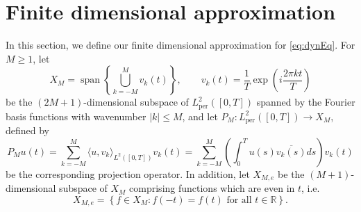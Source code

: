 \documentclass[12pt,reqno]{amsart}
\def\R{{\mathbb R}}
\def\C{{\mathbb C}}
\def\Z{{\mathbb Z}}
\def\per{\textrm{per}}
\DeclareMathOperator{\spn}{span}
\newtheorem{lemma}{Lemma}
\theoremstyle{definition}
\begin{document}

\section{Finite dimensional approximation}\label{sec:findim}

In this section, we define our finite dimensional approximation for \cref{eq:dynEq}. For $M \geq 1$, let 
\begin{equation}\label{eq:XM}
X_M = \spn\left\{ \bigcup_{k = -M}^M v_k(t) \right\}, \qquad
v_k(t) = \frac{1}{T} \exp\left( i \frac{2 \pi k t}{T} \right)
\end{equation}
be the $(2M+1)$-dimensional subspace of $L_\per^2([0,T])$ spanned by the Fourier basis functions with wavenumber $|k| \leq M$, and let $P_M: L_\per^2([0,T]) \rightarrow X_M$, defined by
\begin{equation}\label{eq:PM}
P_M u(t) = \sum_{k=-M}^M \langle u, v_k \rangle_{L^2([0,T])} v_k(t)
= \sum_{k=-M}^M \left( \int_0^T u(s) \overline{v_k(s)} ds \right) v_k(t)
\end{equation}
be the corresponding projection operator. In addition, let $X_{M,e}$ be the $(M+1)$-dimensional subspace of $X_M$ comprising functions which are even in $t$, i.e.
\begin{equation}
X_{M,e} = \left\{ f \in X_M : f(-t) = f(t) \text{ for all }t \in \R \right\}.
\end{equation}
\end{document}
